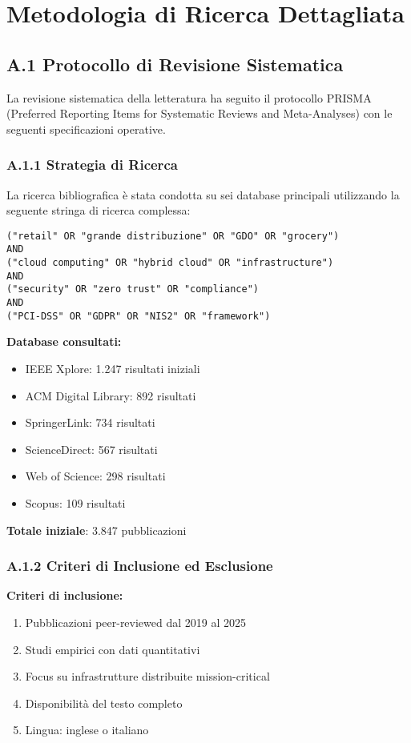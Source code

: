 \appendix
\chapter{Metodologia di Ricerca Dettagliata}
\label{app:metodologia}

\section{A.1 Protocollo di Revisione Sistematica}

La revisione sistematica della letteratura ha seguito il protocollo PRISMA (Preferred Reporting Items for Systematic Reviews and Meta-Analyses) con le seguenti specificazioni operative.

\subsection{A.1.1 Strategia di Ricerca}

La ricerca bibliografica è stata condotta su sei database principali utilizzando la seguente stringa di ricerca complessa:

\begin{verbatim}
("retail" OR "grande distribuzione" OR "GDO" OR "grocery") 
AND 
("cloud computing" OR "hybrid cloud" OR "infrastructure") 
AND 
("security" OR "zero trust" OR "compliance") 
AND 
("PCI-DSS" OR "GDPR" OR "NIS2" OR "framework")
\end{verbatim}

\textbf{Database consultati:}
\begin{itemize}
    \item IEEE Xplore: 1.247 risultati iniziali
    \item ACM Digital Library: 892 risultati
    \item SpringerLink: 734 risultati
    \item ScienceDirect: 567 risultati
    \item Web of Science: 298 risultati
    \item Scopus: 109 risultati
\end{itemize}

\textbf{Totale iniziale}: 3.847 pubblicazioni

\subsection{A.1.2 Criteri di Inclusione ed Esclusione}

\textbf{Criteri di inclusione:}
\begin{enumerate}
    \item Pubblicazioni peer-reviewed dal 2019 al 2025
    \item Studi empirici con dati quantitativi
    \item Focus su infrastrutture distribuite mission-critical
    \item Disponibilità del testo completo
    \item Lingua: inglese o italiano
\end{enumerate}

